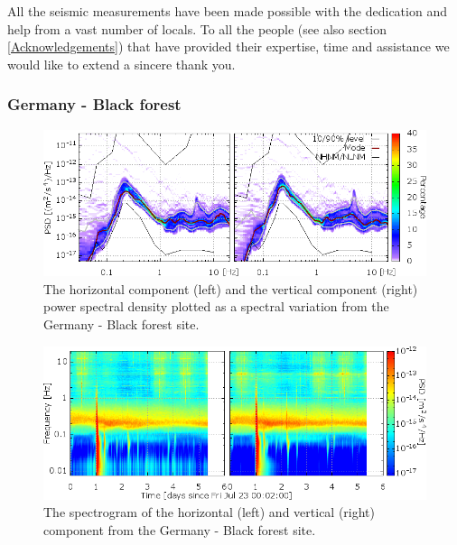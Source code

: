 All the seismic measurements have been made possible with the dedication and help from a vast number of locals. To all the people (see also section \ref{Acknowledgements}) that have provided their expertise, time and assistance we would like to extend a sincere thank you. 

\pagebreak
\FloatBarrier
\subsubsection*{Germany - Black forest}
\begin{figure}[h]
\centering
\includegraphics[width=\textwidth]{./Sec_SiteInfra/Figures/results/ZWald-A_multiplot1}
\caption{The horizontal component (left) and the vertical component (right) power spectral density plotted as a spectral variation from the Germany - Black forest site.}
\label{fig:ZWald-A_multiplot1}
\end{figure}\begin{figure}[h]
\centering
\includegraphics[width=\textwidth]{./Sec_SiteInfra/Figures/results/ZWald-A_multiplot2}
\caption{The spectrogram of the horizontal (left) and vertical (right) component from the Germany - Black forest site.}
\label{fig:ZWald-A_multiplot2}
\end{figure}

\pagebreak
\FloatBarrier
